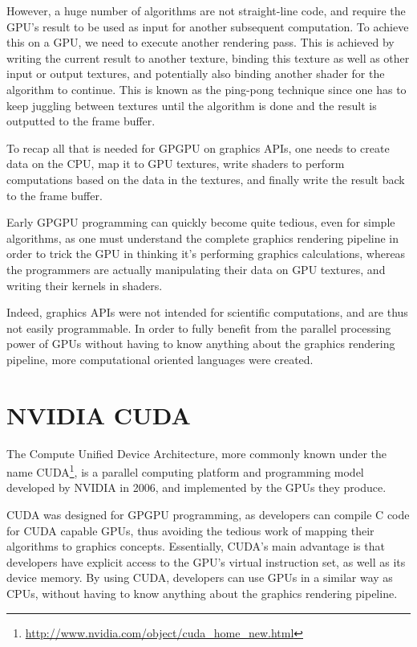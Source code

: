 \documentclass[12pt, a4paper]{report}
\begin{document}
\begin{enumerate}
However, a huge number of algorithms are not straight-line code, and require the
GPU's result to be used as input for another subsequent computation.
To achieve this on a GPU, we need to execute another rendering pass.
This is achieved by writing the current result to another texture, binding this
texture as well as other input or output textures, and potentially also binding
another shader for the algorithm to continue.
This is known as the ping-pong technique since one has to keep juggling between
textures until the algorithm is done and the result is outputted to the frame
buffer.

\end{enumerate}

To recap all that is needed for GPGPU on graphics APIs, one needs to create data
on the CPU, map it to GPU textures, write shaders to perform computations based
on the data in the textures, and finally write the result back to the frame
buffer.

Early GPGPU programming can quickly become quite tedious, even for simple
algorithms, as one must understand the complete graphics rendering pipeline in
order to trick the GPU in thinking it's performing graphics calculations,
whereas the programmers are actually manipulating their data on GPU textures,
and writing their kernels in shaders.

Indeed, graphics APIs were not intended for scientific computations, and are
thus not easily programmable.
In order to fully benefit from the parallel processing power of GPUs without
having to know anything about the graphics rendering pipeline, more
computational oriented languages were created.

\chapter{NVIDIA CUDA}
The Compute Unified Device Architecture, more commonly known under the name
CUDA\footnote{\url{http://www.nvidia.com/object/cuda_home_new.html}}, is a parallel computing platform and programming model developed by
NVIDIA in 2006, and implemented by the GPUs they produce.

CUDA was designed for GPGPU programming, as developers can compile C code for
CUDA capable GPUs, thus avoiding the tedious work of mapping their algorithms to
graphics concepts.
Essentially, CUDA's main advantage is that developers have explicit access to
the GPU's virtual instruction set, as well as its device memory.
By using CUDA, developers can use GPUs in a similar way as CPUs, without having
to know anything about the graphics rendering pipeline.
\end{document}
